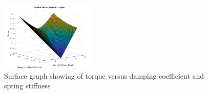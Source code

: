                 \begin{figure}[H]
                    \centering
                    \includegraphics*[width = 0.4\textwidth]{figs/Model/Pitch/Torque_stiffness_damping_surface.png}
                    \caption[Torque surface graph]{Surface graph showing of torque versus damping coefficient and spring stiffness}
                    \label{fig: 3d_plot}
                \end{figure}
    